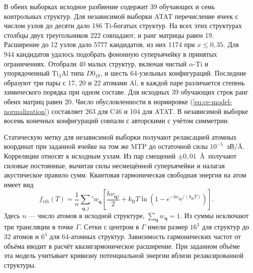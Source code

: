 \documentclass[11pt,a4paper]{article}
\begin{document}
В обеих выборках исходное разбиение содержит 39 обучающих и семь контрольных
структур. Для независимой выборки ATAT перечисление ячеек с числом
узлов до десяти дало 186 Ti-богатых структур. На всех этих структурах
столбцы двух треугольников \(222\) совпадают, и ранг матрицы равен 19.
Расширение до 12 узлов дало 5777 кандидатов, из них 1174 при
\(x\leq0{,}35\). Для 944 кандидатов удалось подобрать фононную суперъячейку
в принятых ограничениях. Отобрали 40 малых структур, включая чистый
\(\alpha\)-Ti и упорядоченный \(\mathrm{Ti}_3\mathrm{Al}\) типа
\(D0_{19}\), и шесть 64-узельных конфигураций. Последние образуют три
пары с 17, 20 и 22 атомами Al, в каждой паре различается степень
химического порядка при одном составе. Для исходных 39 обучающих строк
ранг обеих матриц равен 20. Число обусловленности в нормировке
(\ref{eq:ce-model-normalization}) составляет 263 для C46 и 104 для ATAT.
В независимой выборке восемь конечных конфигураций совпали с
авторскими с учётом симметрии.

Статическую метку для независимой выборки получают релаксацией атомных
координат при заданной ячейке на том же MTP до остаточной силы
\(10^{-5}\)~эВ/\AA. Корреляции относят к исходным узлам. Из пар
смещений \(\pm0{,}01\)~\AA\ получают силовые постоянные, вычитая
силы несмещённой суперъячейки и налагая акустическое правило сумм.
Квантовая гармоническая свободная энергия на атом имеет вид
\begin{equation}
 f_{\mathrm{vib}}(T)=\frac{1}{n}
 \sum_{\mathbf q,j}'w_{\mathbf q}
 \left[\frac{h\nu_{\mathbf qj}}{2}
 +k_{\mathrm B}T\ln\!\left(1-e^{-h\nu_{\mathbf qj}/(k_{\mathrm B}T)}\right)
 \right].
 \label{eq:ce-model-phonon}
\end{equation}
Здесь \(n\) --- число атомов в исходной структуре,
\(\sum_{\mathbf q}w_{\mathbf q}=1\). Из суммы исключают три трансляции
в точке \(\Gamma\). Сетки с центром в \(\Gamma\) имели размер
\(16^3\) для структур до 32 атомов и \(6^3\) для 64-атомных структур.
Зависимость гармонических частот от объёма вводит в расчёт
квазигармоническое расширение. При заданном объёме эта модель учитывает
кривизну потенциальной энергии вблизи релаксированной структуры.
\end{document}
